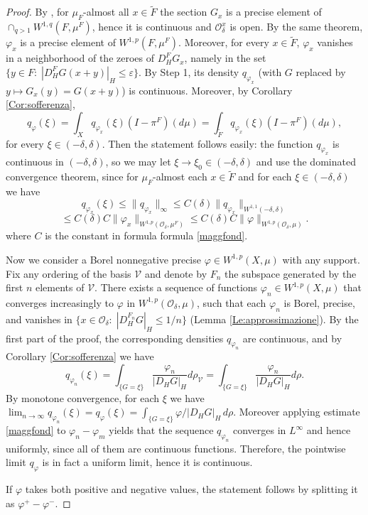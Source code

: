 \documentclass[reqno,twoside,12pt]{amsart}
\begin{document}
\begin{proof}
By \cite[Thm. 4.5]{Feyel}, for $\mu_F$-almost all $x\in \widetilde{F}$ the section $G_x$ is a precise element of $\cap_{q>1}W^{1,q}(F, \mu^F)$, hence it is continuous and ${\mathcal O}_{\delta}^x$ is open. By the same theorem, $\varphi_x$ is a precise element of $W^{1,p}(F, \mu^F)$. Moreover, for every $x\in \widetilde{F}$, $\varphi_x$ vanishes in a neighborhood of the zeroes of $D_H^FG_x$, namely in the set $\{y\in F:\; |D_H^FG(x+y)|_H \leq {\varepsilon}\}$. 
By Step 1,  its density
$q_{\varphi_x}$ (with $G$ replaced by $y\mapsto G_x(y) = G(x+y)$) is continuous. Moreover, by Corollary \ref{Cor:sofferenza},  
\begin{equation}
\label{sezione}
q_{\varphi}(\xi) = \int_{X} q_{\varphi_x}(\xi) (I-\pi^F)(d\mu) = \int_{\widetilde{F} } q_{\varphi_x}(\xi) (I-\pi^F)(d\mu), 
\end{equation}
for every $\xi\in (-\delta, \delta)$. Then the statement follows easily:   the function $q_{\varphi_x}$ is continuous in $(-\delta, \delta)$, so we may let $\xi\to \xi_0 \in (-\delta, \delta)$ and use the dominated convergence theorem, since for $\mu_F$-almost each $x\in \widetilde{F}$ and for each  $\xi \in (-\delta, \delta)$ we have
$$q_{\varphi_x}(\xi) \leq \| q_{\varphi_x}\|_{\infty} \leq C(\delta) \|q_{\varphi_x}\|_{W^{1,1}(-\delta, \delta)} $$
$$\leq C(\delta) C \|\varphi_x\|_{W^{1,p}({\mathcal O}_{\delta}, \mu^F)} \leq   C(\delta) C \|\varphi \|_{W^{1,p}({\mathcal O}_{\delta}, \mu)} .$$
where $C$ is the constant in formula formula \eqref{maggfond}. 

Now we consider a Borel nonnegative precise $\varphi \in W^{1,p}(X, \mu)$ with any support. Fix any ordering of the basis $\mathcal V$ and 
denote by $F_n$ the subspace generated by the first $n$ elements of  $\mathcal V$. 
There exists a sequence of functions $\varphi_n\in W^{1,p}(X, \mu)$ that converges increasingly to $\varphi $ in $ W^{1,p}({\mathcal O}_{\delta}, \mu)$, such that each $\varphi_n$ is Borel, precise, and vanishes in $\{x\in {\mathcal O}_{\delta}:\; |D_H^{F_n}G|_H\leq 1/n\}$ (Lemma \ref{Le:approssimazione}). By the first part of the proof, the corresponding densities $q_{\varphi_n}$ are continuous, and by Corollary \ref{Cor:sofferenza} we have
$$q_{\varphi_n}(\xi) =  \int_{\{G=\xi\}} \frac{\varphi_n}{|D_HG|_H}d\rho _{\mathcal V} =  \int_{\{G=\xi\}} \frac{\varphi_n}{|D_HG|_H}d\rho .$$
By monotone convergence, for each $\xi$ we have $\lim_{n\to \infty}q_{\varphi_n}(\xi) =  q_{\varphi}(\xi) =  \int_{\{G=\xi\}} \varphi /|D_HG|_H\,d\rho $. Moreover applying estimate \eqref{maggfond} to $\varphi_n-\varphi_m$ yields that the sequence $q_{ \varphi_n}$ converges in $L^{\infty}$ and hence uniformly, since all of them are continuous functions. Therefore, the pointwise limit $q_{\varphi}$ is in fact a uniform limit, hence it is continuous. 
 
If $\varphi $ takes both positive and negative values, the statement follows by splitting it as $\varphi^+ - \varphi^-$. 
\end{proof}
\end{document}
